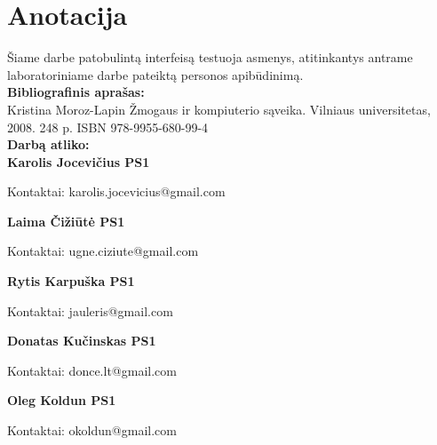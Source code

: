 

\newcommand{\anotacijaIndelis}[3]{
	\textbf{#1}
	\begin{flushleft}
	\hspace*{1cm}
	Kontaktai: #2
	\\
	\hspace*{1cm}
	Indėlis: #3
	\end{flushleft}
}

\newcommand{\anotacija}[2]{
	\textbf{#1}
	\begin{flushleft}
	\hspace*{1cm}
	Kontaktai: #2
	\end{flushleft}
}

\section*{Anotacija}

		Šiame darbe patobulintą interfeisą testuoja asmenys, atitinkantys antrame laboratoriniame darbe pateiktą personos apibūdinimą. \\
		
		\textbf{Bibliografinis aprašas:}\\
		Kristina Moroz-Lapin Žmogaus ir kompiuterio sąveika. Vilniaus universitetas, 2008. 248 p. ISBN 978-9955-680-99-4
		\\
		
		\textbf{Darbą atliko:}\\

		\anotacija{Karolis Jocevičius PS1}{karolis.jocevicius@gmail.com}
		
		\anotacija{Laima Čižiūtė PS1}{ugne.ciziute@gmail.com}
		
		\anotacija{Rytis Karpuška PS1}{jauleris@gmail.com}

		\anotacija{Donatas Kučinskas PS1}{donce.lt@gmail.com}

		\anotacija{Oleg Koldun PS1}{okoldun@gmail.com}
